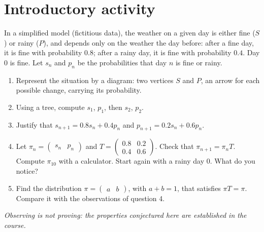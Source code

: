 \mxnewpage
\section{Introductory activity}
\begin{activity}
In a simplified model (fictitious data), the weather on a given day is either fine ($S$) or rainy ($P$), and depends only on the weather the day before: after a fine day, it is fine with probability $\num{0,8}$; after a rainy day, it is fine with probability $\num{0,4}$. Day $0$ is fine. Let $s_n$ and $p_n$ be the probabilities that day $n$ is fine or rainy.
\begin{enumerate}
\item Represent the situation by a diagram: two vertices $S$ and $P$, an arrow for each possible change, carrying its probability.
\item Using a tree, compute $s_1$, $p_1$, then $s_2$, $p_2$.
\item Justify that $s_{n+1}=\num{0,8}s_n+\num{0,4}p_n$ and $p_{n+1}=\num{0,2}s_n+\num{0,6}p_n$.
\item Let $\pi_n=\begin{pmatrix}s_n&p_n\end{pmatrix}$ and $T=\begin{pmatrix}\num{0,8}&\num{0,2}\\\num{0,4}&\num{0,6}\end{pmatrix}$. Check that $\pi_{n+1}=\pi_nT$. Compute $\pi_{10}$ with a calculator. Start again with a rainy day $0$. What do you notice?
\item Find the distribution $\pi=\begin{pmatrix}a&b\end{pmatrix}$, with $a+b=1$, that satisfies $\pi T=\pi$. Compare it with the observations of question 4.
\end{enumerate}
\par\emph{Observing is not proving: the properties conjectured here are established in the course.}
\end{activity}
